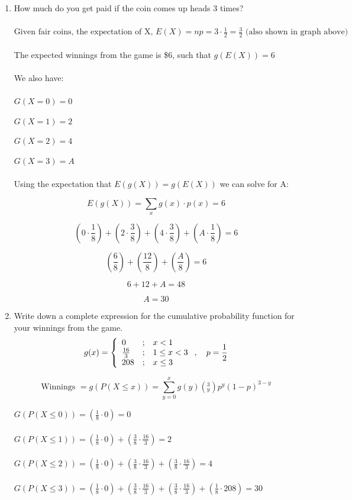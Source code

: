 \documentclass[12pt,a4paper]{article}
\numberwithin{equation}{subsection}
\begin{document}
\begin{enumerate}
\begin{enumerate}
\item How much do you get paid if the coin comes up heads 3 times?
\\
\\
$\text{Given fair coins, the expectation of X, } E(X) = np = 3 \cdot \frac{1}{2} = \frac{3}{2} \text{ (also shown in graph above)}$
\\
\\
The expected winnings from the game is \$6, such that $g(E(X)) = 6$
\\
\\
We also have:
\\
\\
$G(X=0) = 0$

$G(X=1) = 2$

$G(X=2) = 4$

$G(X=3) = A$
\\
\\
Using the expectation that $E(g(X)) = g(E(X))$ we can solve for A:

$$E(g(X)) = \sum_x g(x) \cdot p(x) = 6$$

$$(0 \cdot \frac{1}{8}) + (2 \cdot \frac{3}{8}) + (4 \cdot \frac{3}{8}) +  (A \cdot \frac{1}{8} ) = 6$$

$$(\frac{6}{8}) + (\frac{12}{8}) + (\frac{A}{8}) = 6$$

$$6 + 12 + A = 48$$

$$A = 30$$


\item Write down a complete expression for the cumulative probability function for your winnings from the game.
\\
$$g(x) = \left\{\begin{array}{{lcl}} 0 &;& x < 1 \\  \frac{16}{3} &;& 1 \leq x < 3 \\  208 &;& x \leq 3 \end{array} \right.,\quad  p=\frac{1}{2}$$

$$\text{Winnings } = g(P(X \leq x)) = \sum_{y=0}^x g(y) \left(^3_y \right)p^y(1-p)^{3-y}$$

$G(P(X \leq 0)) = (\frac{1}{8} \cdot 0) = 0$
\\
\\
$G(P(X \leq 1)) = (\frac{1}{8} \cdot 0) + (\frac{3}{8} \cdot \frac{16}{3}) = 2$
\\
\\
$G(P(X \leq 2)) = (\frac{1}{8} \cdot 0) + (\frac{3}{8} \cdot \frac{16}{3}) + (\frac{3}{8} \cdot \frac{16}{3}) = 4$
\\
\\
$G(P(X \leq 3)) = (\frac{1}{8} \cdot 0) + (\frac{3}{8} \cdot \frac{16}{3}) + (\frac{3}{8} \cdot \frac{16}{3}) + (\frac{1}{8} \cdot 208) = 30$


\end{enumerate}
\end{enumerate}
\end{document}
